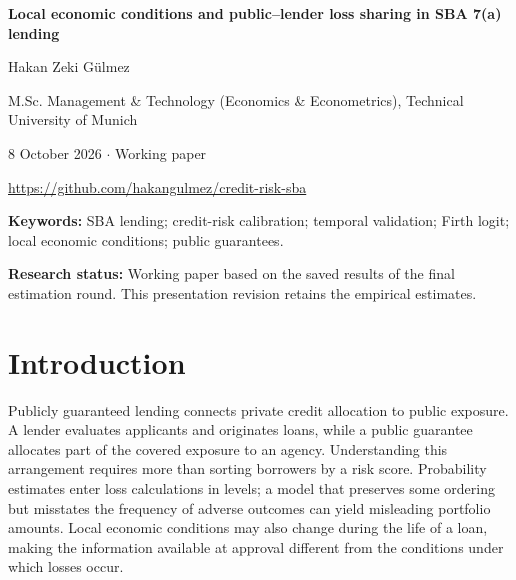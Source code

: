 

\begin{center}
{\LARGE\bfseries Local economic conditions and public--lender loss sharing in SBA 7(a) lending}\par\vspace{6pt}
Hakan Zeki Gülmez\par
M.Sc. Management \& Technology (Economics \& Econometrics), Technical University of Munich\par
8 October 2026 \quad $\cdot$ \quad Working paper\par\small \url{https://github.com/hakangulmez/credit-risk-sba}
\end{center}
\begin{abstract}
We study the temporal calibration of credit-risk models and conditional public--lender loss sharing in approved and disbursed SBA 7(a) loans. Official administrative records define the outcome as recorded charge-off within 36 months of first disbursement. Term-free Firth logistic models have modest out-of-time discrimination: crisis AUC is \AucCrisis. Mean predicted crisis risk is \PdCrisis\%, compared with \RateCrisis\% recorded; later-cohort risk is \PdLater\%, compared with \RateLater\%. A separate macro-conditioned model associates a one-percentage-point increase in window-end unemployment relative to its starting value with \Endpoint\ probability percentage points on a fixed reference portfolio. Baseline and adverse expected-loss proxies are \ElBase\ and \ElAdverse\ million dollars under full-disbursement, gross-severity and pro-rata guarantee assumptions. The evidence highlights calibration failure and the dependence of scenario accounting on probability and loss assumptions. Future realized macro paths, unverified feature vintages, revised data and a post-results design amendment limit interpretation. The analysis estimates neither causal guarantee effects nor actual fiscal costs.
\end{abstract}
\noindent\textbf{Keywords:} SBA lending; credit-risk calibration; temporal validation; Firth logit; local economic conditions; public guarantees.\par
\noindent\textbf{Research status:} Working paper based on the saved results of the final estimation round. This presentation revision retains the empirical estimates.

\section{Introduction}
Publicly guaranteed lending connects private credit allocation to public exposure. A lender evaluates applicants and originates loans, while a public guarantee allocates part of the covered exposure to an agency. Understanding this arrangement requires more than sorting borrowers by a risk score. Probability estimates enter loss calculations in levels; a model that preserves some ordering but misstates the frequency of adverse outcomes can yield misleading portfolio amounts. Local economic conditions may also change during the life of a loan, making the information available at approval different from the conditions under which losses occur.

